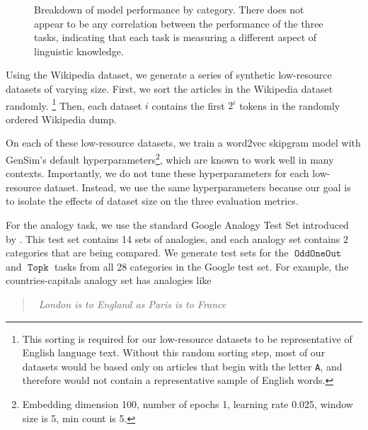 \documentclass[11pt,a4paper]{article}
\DeclareMathOperator{\OddOneOut}{\texttt{OddOneOut}}
\DeclareMathOperator{\topk}{\texttt{Topk}}
\begin{document}
\begin{figure}
\caption{
    Breakdown of model performance by category.
    There does not appear to be any correlation between the performance of the three tasks,
    indicating that each task is measuring a different aspect of linguistic knowledge.
   }
\label{fig:cross_cat_acc}
\end{figure}

Using the Wikipedia dataset, we generate a series of synthetic low-resource datasets of varying size.
First, we sort the articles in the Wikipedia dataset randomly.%
\footnote{
    This sorting is required for our low-resource datasets to be representative of English language text.
    Without this random sorting step,
    most of our datasets would be based only on articles that begin with the letter \texttt{A},
    and therefore would not contain a representative sample of English words.
}
Then, each dataset $i$ contains the first $2^i$ tokens in the randomly ordered Wikipedia dump.

On each of these low-resource datasets,
we train a word2vec skipgram model with GenSim's default hyperparameters\footnote{
Embedding dimension 100, number of epochs 1, learning rate 0.025, window size is 5, min count is 5.
},
which are known to work well in many contexts.
Importantly, we do not tune these hyperparameters for each low-resource dataset.
Instead, we use the same hyperparameters because our goal is to isolate the effects of dataset size on the three evaluation metrics.


For the analogy task, we use the standard Google Analogy Test Set introduced by \citep{mikolov2013efficient}.
This test set contains 14 sets of analogies,
and each analogy set contains 2 categories that are being compared.
We generate test sets for the $\OddOneOut$ and $\topk$ tasks from all 28 categories in the Google test set.
For example,
the countries-capitals analogy set has analogies like
\begin{quote}
    ~\!\!\!\!\!\!\emph{London is to England as Paris is to France}
\end{quote}
\end{document}
